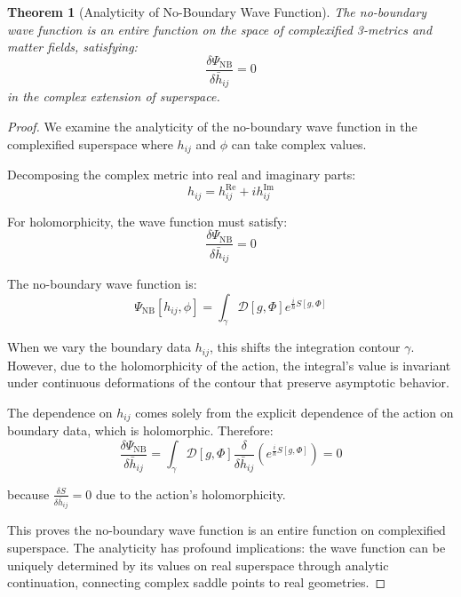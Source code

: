 \documentclass{article}
\newtheorem{theorem}{Theorem}
\begin{document}
\begin{theorem}[Analyticity of No-Boundary Wave Function]
  The no-boundary wave function is an entire function on the space of
  complexified 3-metrics and matter fields, satisfying:
  \begin{equation}
    \frac{\delta \Psi_{\text{NB}}}{\delta \bar{h}_{ij}} = 0
  \end{equation}
  in the complex extension of superspace.
\end{theorem}

\begin{proof}
We examine the analyticity of the no-boundary wave function in the complexified superspace where $h_{ij}$ and $\phi$ can take complex values.

Decomposing the complex metric into real and imaginary parts:
\begin{equation}
h_{ij} = h_{ij}^\text{Re} + i h_{ij}^\text{Im}
\end{equation}

For holomorphicity, the wave function must satisfy:
\begin{equation}
\frac{\delta \Psi_\text{NB}}{\delta \bar{h}_{ij}} = 0
\end{equation}

The no-boundary wave function is:
\begin{equation}
\Psi_\text{NB}[h_{ij}, \phi] = \int_\gamma \mathcal{D}[g, \Phi] e^{\frac{i}{\hbar}S[g, \Phi]}
\end{equation}

When we vary the boundary data $h_{ij}$, this shifts the integration contour $\gamma$. However, due to the holomorphicity of the action, the integral's value is invariant under continuous deformations of the contour that preserve asymptotic behavior.

The dependence on $h_{ij}$ comes solely from the explicit dependence of the action on boundary data, which is holomorphic. Therefore:
\begin{equation}
\frac{\delta \Psi_\text{NB}}{\delta \bar{h}_{ij}} = \int_\gamma \mathcal{D}[g, \Phi] \frac{\delta}{\delta \bar{h}_{ij}} \left(e^{\frac{i}{\hbar}S[g, \Phi]}\right) = 0
\end{equation}

because $\frac{\delta S}{\delta \bar{h}_{ij}} = 0$ due to the action's holomorphicity.

This proves the no-boundary wave function is an entire function on complexified superspace. The analyticity has profound implications: the wave function can be uniquely determined by its values on real superspace through analytic continuation, connecting complex saddle points to real geometries.
\end{proof}
\end{document}
